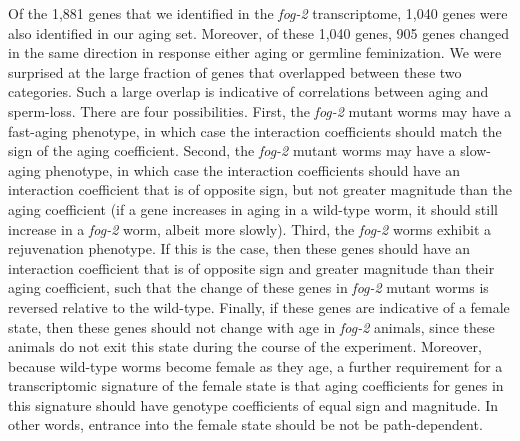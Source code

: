 \documentclass[10pt,letterpaper,twocolumn]{article}
\newcommand{\fog}{\emph{\mbox{fog-2}}}
\newcommand{\fogn}{1,881}
\newcommand{\coexpressed}{905}
\newcommand{\intersectn}{1,040}
\begin{document}
Of the \fogn{} genes that we identified in the \fog{}
transcriptome, \intersectn{} genes were also identified in our aging set.
Moreover, of these \intersectn{}  genes, \coexpressed{} genes changed in the
same direction in response either aging or germline feminization.
We were surprised at the large fraction of genes that overlapped between these
two categories. Such a large overlap is indicative of correlations between aging
and sperm-loss. There are four possibilities. First, the \fog{} mutant worms may
have a fast-aging phenotype, in which case the interaction coefficients should
match the sign of the aging coefficient. Second, the \fog{} mutant worms may
have a slow-aging phenotype, in which case the interaction coefficients should
have an interaction coefficient that is of opposite sign, but not greater
magnitude than the aging coefficient (if a gene increases in aging in a
wild-type worm, it should still increase in a \fog{} worm, albeit more slowly).
Third, the \fog{} worms exhibit a rejuvenation phenotype. If this is the case,
then these genes should have an interaction coefficient that is of opposite sign
and greater magnitude than their aging coefficient, such that the change of
these genes in \fog{} mutant worms is reversed relative to the wild-type.
Finally, if these genes are indicative of a female state, then these genes
should not change with age in \fog{} animals, since these animals do not exit
this state during the course of the experiment. Moreover, because wild-type
worms become female as they age, a further requirement for a transcriptomic
signature of the female state is that aging coefficients for genes in this
signature should have genotype coefficients of equal sign and magnitude. In
other words, entrance into the female state should be not be path-dependent.
\end{document}
